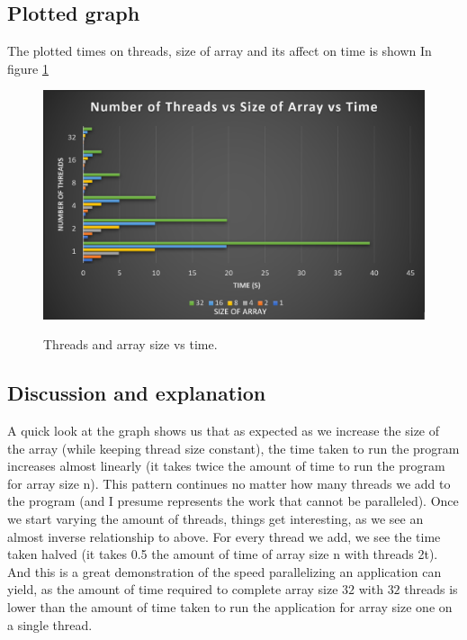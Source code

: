 \subsection{Plotted graph}

The plotted times on threads, size of array and its affect on time is shown In
figure \ref{fig:threasizetime}

\begin{figure}
    \centering
    \includegraphics[width=\linewidth]{Figures/graph.png}
    \label{fig:threasizetime}
    \caption{Threads and array size vs time.}
\end{figure}

\subsection{Discussion and explanation} 
A quick look at the graph shows us that as expected as we increase the size 
of the array (while keeping thread size constant), the time taken to run the 
program increases almost linearly (it takes twice the amount of time to run the 
program for array size n). This pattern continues no matter how many threads 
we add to the program (and I presume represents the work that cannot be 
paralleled). Once we start varying the amount of threads, things get 
interesting, as we see an almost inverse relationship to above. For every thread
we add, we see the time taken halved (it takes 0.5 the amount of time of array 
size n with threads 2t). And this is a great demonstration of the speed 
parallelizing an application can yield, as the amount of time required to 
complete array size $32$ with $32$ threads is lower than the amount of time taken
to run the application for array size one on a single thread.
